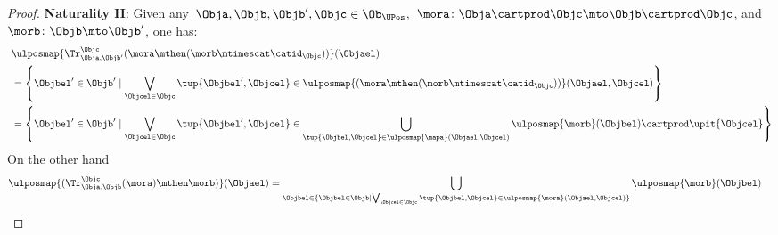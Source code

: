 \begin{proof}
    \textbf{Naturality II}:
    Given any~$\Obja,\Objb,\Objb',\Objc \in \Ob_{\UPos}$,~$\mora\colon \Obja\cartprod \Objc \mto \Objb\cartprod \Objc$, and~$\morb\colon \Objb\mto \Objb'$, one has:
    \begin{equation*}
        \begin{aligned}
            ~ & \ulposmap{\Tr_{\Obja,\Objb'}^{\Objc}(\mora \mthen (\morb \mtimescat \catid_\Objc))}(\Objael)                                                                                                                            \\
              & =
            \left \{\Objbel'\in \Objb' \mid \bigvee_{\Objcel\in \Objc} \tup{\Objbel',\Objcel}\in \ulposmap{(\mora \mthen (\morb \mtimescat \catid_\Objc))}(\Objael,\Objcel)\right\}                                                     \\
              & =\left\{ \Objbel'\in \Objb'\mid \bigvee_{\Objcel\in \Objc} \tup{\Objbel',\Objcel}\in \bigcup_{\tup{\Objbel,\Objcel}\in \ulposmap{\mapa}(\Objael,\Objcel)} \ulposmap{\morb}(\Objbel) \cartprod \upit\{ \Objcel\}\right\}
        \end{aligned}
    \end{equation*}
    On the other hand
    \begin{equation*}
        \begin{aligned}
            \ulposmap{(\Tr_{\Obja,\Objb}^{\Objc}(\mora)\mthen \morb)}(\Objael) & =
            \bigcup_{\Objbel \in \{ \Objbel \in \Objb \mid \bigvee_{\Objcel \in \Objc}\tup{\Objbel,\Objcel}\in \ulposmap{\mora}(\Objael,\Objcel)\}}\ulposmap{\morb}(\Objbel)
        \end{aligned}
    \end{equation*}

\end{proof}
